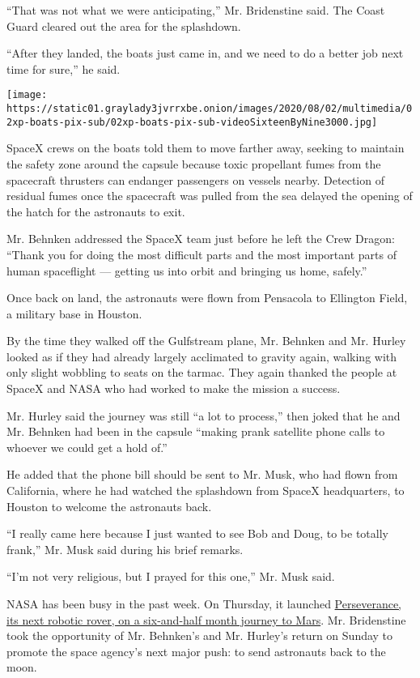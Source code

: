 ``That was not what we were anticipating,'' Mr. Bridenstine said. The
Coast Guard cleared out the area for the splashdown.

``After they landed, the boats just came in, and we need to do a better
job next time for sure,'' he said.

\texttt{[image: https://static01.graylady3jvrrxbe.onion/images/2020/08/02/multimedia/02xp-boats-pix-sub/02xp-boats-pix-sub-videoSixteenByNine3000.jpg]}

SpaceX crews on the boats told them to move farther away, seeking to
maintain the safety zone around the capsule because toxic propellant
fumes from the spacecraft thrusters can endanger passengers on vessels
nearby. Detection of residual fumes once the spacecraft was pulled from
the sea delayed the opening of the hatch for the astronauts to exit.

Mr. Behnken addressed the SpaceX team just before he left the Crew
Dragon: ``Thank you for doing the most difficult parts and the most
important parts of human spaceflight --- getting us into orbit and
bringing us home, safely.''

Once back on land, the astronauts were flown from Pensacola to Ellington
Field, a military base in Houston.

By the time they walked off the Gulfstream plane, Mr. Behnken and Mr.
Hurley looked as if they had already largely acclimated to gravity
again, walking with only slight wobbling to seats on the tarmac. They
again thanked the people at SpaceX and NASA who had worked to make the
mission a success.

Mr. Hurley said the journey was still ``a lot to process,'' then joked
that he and Mr. Behnken had been in the capsule ``making prank satellite
phone calls to whoever we could get a hold of.''

He added that the phone bill should be sent to Mr. Musk, who had flown
from California, where he had watched the splashdown from SpaceX
headquarters, to Houston to welcome the astronauts back.

``I really came here because I just wanted to see Bob and Doug, to be
totally frank,'' Mr. Musk said during his brief remarks.

``I'm not very religious, but I prayed for this one,'' Mr. Musk said.

NASA has been busy in the past week. On Thursday, it launched
\href{https://www.nytimes3xbfgragh.onion/2020/07/30/science/nasa-mars-launch.html}{Perseverance,
its next robotic rover, on a six-and-half month journey to Mars}. Mr.
Bridenstine took the opportunity of Mr. Behnken's and Mr. Hurley's
return on Sunday to promote the space agency's next major push: to send
astronauts back to the moon.

